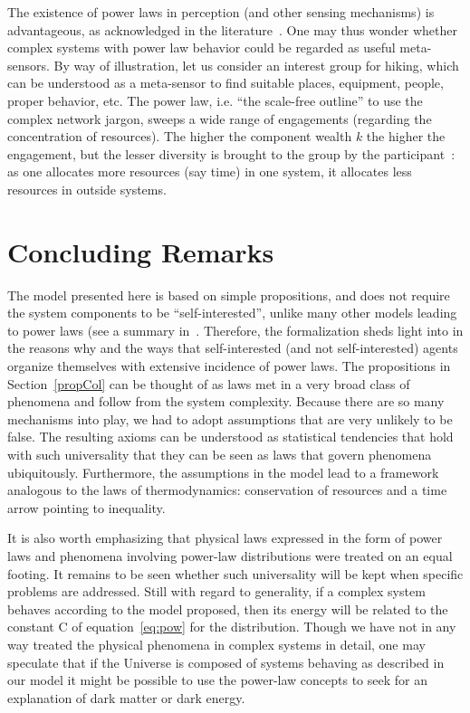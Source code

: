 \documentclass[10pt,letterpaper]{article}
\begin{document}
The existence of power laws in perception (and other sensing mechanisms) is advantageous, as acknowledged in the literature~\cite{psycho}. One may thus wonder whether complex systems with power law behavior could be regarded as useful meta-sensors. By way of illustration, let us consider an interest group for hiking, which can be understood as a meta-sensor to find suitable 
places, equipment, people, proper behavior, etc.
The power law, i.e. ``the scale-free outline'' to use
the complex network jargon, sweeps a wide range of engagements (regarding the concentration of resources).
The higher the component wealth $k$ the higher the engagement,
but the lesser diversity is brought to the group
by the participant~\cite{tStable}: as one allocates more resources (say time) in one system, it allocates less resources in outside systems.

\section{Concluding Remarks}
The model presented here is based on simple propositions, and does not require the system components to be ``self-interested'',
unlike many other models leading to power laws (see a summary in~\cite{newmanpower,part}. Therefore, the formalization sheds light into in the reasons why and the ways that self-interested (and not self-interested) agents organize themselves with extensive incidence of power laws. The propositions in Section~\ref{propCol} can be thought of as laws met in a very broad class of phenomena and follow from the system complexity. Because there are so many mechanisms into play, we had to adopt assumptions that are very unlikely to be false. The resulting axioms can be understood as statistical tendencies that hold with such universality that they can be seen as laws that govern phenomena ubiquitously. 
Furthermore, the assumptions in the model lead to a framework analogous to the laws of thermodynamics:
conservation of resources and a time arrow pointing to inequality.

It is also worth emphasizing that physical laws expressed in the form of power laws and phenomena involving power-law distributions were treated on an equal footing. It remains to be seen whether such universality will be kept when specific problems are addressed. Still with regard to generality, if a complex system behaves according to the model proposed, then its energy will be related to the constant C of equation~\ref{eq:pow} for the distribution. Though we have not in any way treated the physical phenomena in complex systems in detail, one may speculate that if the Universe is composed of systems behaving as described in our model it might be possible to use the power-law concepts to seek for an explanation of dark matter or dark energy. 
\end{document}
